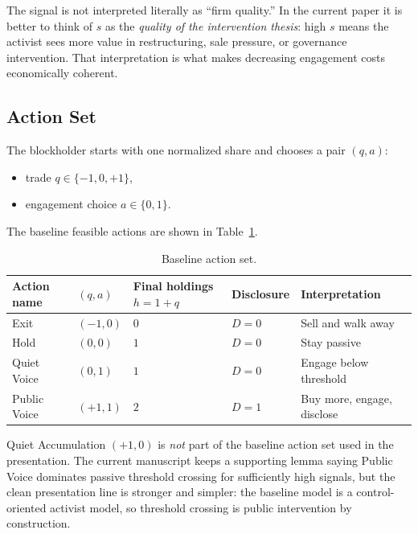 \documentclass[11pt,a4paper]{article}
\theoremstyle{definition}
\theoremstyle{plain}
\theoremstyle{remark}
\newcommand{\1}{\mathbf{1}}
\newcommand{\choice}[1]{{\color{MidnightBlue}#1}}
\begin{document}
\begin{intuitionbox}
The signal is not interpreted literally as ``firm quality.'' In the current paper it is better to think of $s$ as the \emph{quality of the intervention thesis}: high $s$ means the activist sees more value in restructuring, sale pressure, or governance intervention. That interpretation is what makes decreasing engagement costs economically coherent.
\end{intuitionbox}

\subsection{Action Set}

The blockholder starts with one normalized share and chooses a pair $(q,a)$:
\begin{itemize}
\item trade \choice{$q \in \{-1,0,+1\}$},
\item engagement choice \choice{$a \in \{0,1\}$}.
\end{itemize}

The baseline feasible actions are shown in Table~\ref{tab:actions}.

\begin{table}[h]
\centering
\begin{tabular}{@{}lllll@{}}
\toprule
Action name & $(q,a)$ & Final holdings $h=1+q$ & Disclosure & Interpretation \\
\midrule
Exit & $(-1,0)$ & $0$ & $D=0$ & Sell and walk away \\
Hold & $(0,0)$ & $1$ & $D=0$ & Stay passive \\
Quiet Voice & $(0,1)$ & $1$ & $D=0$ & Engage below threshold \\
Public Voice & $(+1,1)$ & $2$ & $D=1$ & Buy more, engage, disclose \\
\bottomrule
\end{tabular}
\caption{Baseline action set.}
\label{tab:actions}
\end{table}

\begin{warningbox}
Quiet Accumulation $(+1,0)$ is \emph{not} part of the baseline action set used in the presentation. The current manuscript keeps a supporting lemma saying Public Voice dominates passive threshold crossing for sufficiently high signals, but the clean presentation line is stronger and simpler: the baseline model is a control-oriented activist model, so threshold crossing is public intervention by construction.
\end{warningbox}
\end{document}
